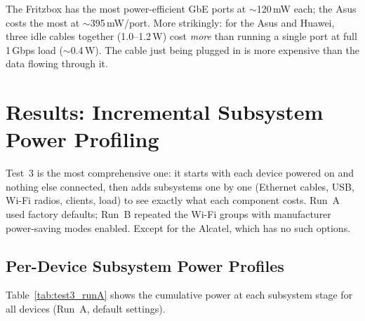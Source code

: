 The Fritzbox has the most power-efficient \ac{GbE} ports at $\sim$120\,mW each; the Asus costs the most at $\sim$395\,mW/port.
More strikingly: for the Asus and Huawei, three idle cables together (1.0--1.2\,W) cost \emph{more} than running a single port at full 1\,Gbps load ($\sim$0.4\,W). The cable just being plugged in is more expensive than the data flowing through it.

\section{Results: Incremental Subsystem Power Profiling}
\label{sec:results-subsystem}

Test~3 is the most comprehensive one: it starts with each device powered on and nothing else connected, then adds subsystems one by one (Ethernet cables, \ac{USB}, Wi-Fi radios, clients, load) to see exactly what each component costs.
Run~A used factory defaults; Run~B repeated the Wi-Fi groups with manufacturer power-saving modes enabled. Except for the Alcatel, which has no such options.

\subsection{Per-Device Subsystem Power Profiles}
\label{sec:test3-per-device}

Table~\ref{tab:test3_runA} shows the cumulative power at each subsystem stage for all devices (Run~A, default settings).

